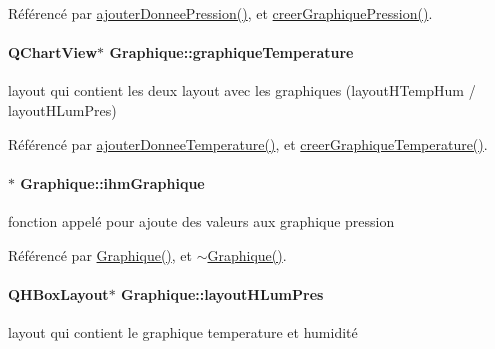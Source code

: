 Référencé par \hyperlink{class_graphique_a289f0631e56465012511fd7ec9da1b23}{ajouter\+Donnee\+Pression()}, et \hyperlink{class_graphique_adc50b5ae7a54dd576c99e74ec6bf74c5}{creer\+Graphique\+Pression()}.

\paragraph[{\texorpdfstring{graphique\+Temperature}{graphiqueTemperature}}]{\setlength{\rightskip}{0pt plus 5cm}Q\+Chart\+View$\ast$ Graphique\+::graphique\+Temperature\hspace{0.3cm}{\ttfamily [private]}}\hypertarget{class_graphique_a485cc4a65014e812b9e4aa9ee3ea9ca4}{}\label{class_graphique_a485cc4a65014e812b9e4aa9ee3ea9ca4}
layout qui contient les deux layout \textquotesingle{}avec les graphiques (layout\+H\+Temp\+Hum / layout\+H\+Lum\+Pres) 

Référencé par \hyperlink{class_graphique_a42b3c986ca86c426adbb8fdb03a04380}{ajouter\+Donnee\+Temperature()}, et \hyperlink{class_graphique_ad9b976804bafcbfe451d89fd35729d16}{creer\+Graphique\+Temperature()}.

\paragraph[{\texorpdfstring{ihm\+Graphique}{ihmGraphique}}]{$\ast$ Graphique\+::ihm\+Graphique\hspace{0.3cm}{\ttfamily [private]}}\hypertarget{class_graphique_a55d98b20085f7c79f42f3ae0423ac72a}{}\label{class_graphique_a55d98b20085f7c79f42f3ae0423ac72a}
fonction appelé pour ajoute des valeurs aux graphique pression 

Référencé par \hyperlink{class_graphique_a3aec0a5aaae78f0726771dea67af69b4}{Graphique()}, et \hyperlink{class_graphique_a1bb866eb859b961cf0cdddc1b289a773}{$\sim$\+Graphique()}.

\paragraph[{\texorpdfstring{layout\+H\+Lum\+Pres}{layoutHLumPres}}]{\setlength{\rightskip}{0pt plus 5cm}Q\+H\+Box\+Layout$\ast$ Graphique\+::layout\+H\+Lum\+Pres\hspace{0.3cm}{\ttfamily [private]}}\hypertarget{class_graphique_a622c90a88a11b29aa275906a3ee051ef}{}\label{class_graphique_a622c90a88a11b29aa275906a3ee051ef}
layout qui contient le graphique temperature et humidité 

